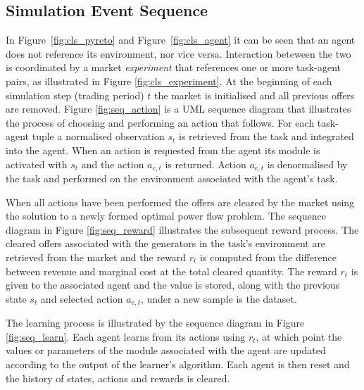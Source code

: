 \subsection{Simulation Event Sequence}
In Figure~\ref{fig:cls_pyreto} and Figure~\ref{fig:cls_agent} it can be seen
that an agent does not reference its environment, nor vice versa.  Interaction
beteween the two is coordinated by a market \textit{experiment} that references
one or more task-agent pairs, as illustrated in Figure \ref{fig:cls_experiment}.
 At the beginning of each simulation step (trading period) $t$ the market is
initialised and all previous offers are removed.  Figure \ref{fig:seq_action} is
a UML sequence diagram that illustrates the process of choosing and performing
an action that follows.  For each task-agent tuple a normalised observation
$s_t$ is retrieved from the task and integrated into the agent. When an action
is requested from the agent its module is activated with $s_t$ and the action
$a_{e,t}$ is returned.  Action $a_{e,t}$ is denormalised by the task and
performed on the environment associated with the agent's task.


When all actions have been performed the offers are cleared by the market using
the solution to a newly formed optimal power flow problem.  The sequence diagram
in Figure \ref{fig:seq_reward} illustrates the subsequent reward process. The
cleared offers associated with the generators in the task's environment are
retrieved from the market and the reward $r_t$ is computed from the difference
between revenue and marginal cost at the total cleared quantity.
The reward $r_t$ is given to the associated agent and the value is stored, along
with the previous state $s_t$ and selected action $a_{e,t}$, under a new sample
is the dataset.


The learning process is illustrated by the sequence diagram in Figure
\ref{fig:seq_learn}.  Each agent learns from its actions using $r_t$, at which
point the values or parameters of the module associated with the agent are
updated according to the output of the learner's algorithm.  Each agent is then
reset and the history of states, actions and rewards is cleared.

